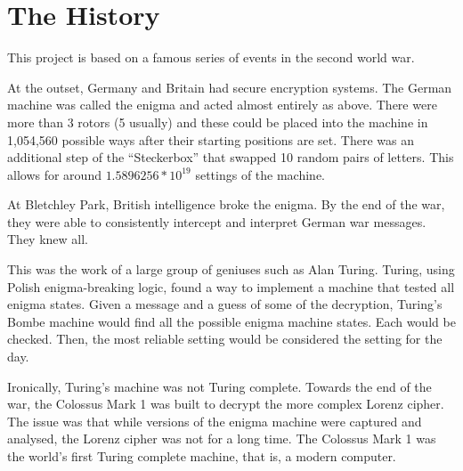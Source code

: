 \documentclass[11pt]{article}
\begin{document}
\section{The History}
This project is based on a famous series of events in the second world war.

At the outset, Germany and Britain had secure encryption systems.
The German machine was called the enigma and acted almost entirely as above.
There were more than 3 rotors (5 usually) and these could be placed into the machine in
1,054,560 possible ways after their starting positions are set.
There was an additional step of the ``Steckerbox'' that swapped 10 random pairs
of letters.
This allows for around $1.5896256 * 10^{19}$ settings of the machine.

At Bletchley Park, British intelligence broke the enigma. By the end of the war,
they were able to consistently intercept and interpret German war messages.
They knew all.

This was the work of a large group of geniuses such as Alan Turing. Turing,
using Polish enigma-breaking logic, found a way to implement a machine that
tested all enigma states. Given a message and a guess of some of the
decryption, Turing's Bombe machine would find all the possible enigma machine
states. Each would be checked. Then, the most reliable setting would be considered
the setting for the day.

Ironically, Turing's machine was not Turing complete. Towards the end of the war,
the Colossus Mark 1 was built to decrypt the more complex Lorenz cipher.
The issue was that while versions of the enigma machine were captured and
analysed, the Lorenz cipher was not for a long time. The Colossus Mark 1 was the
world's first Turing complete machine, that is, a modern computer.
\end{document}
